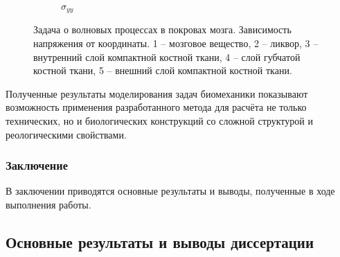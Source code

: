 \begin{figure}[H]
\begin{subfigure}[b]{0.3\textwidth}
\caption{$\sigma_{yy}$}
\end{subfigure}
\caption{Задача о волновых процессах в покровах мозга. Зависимость напряжения от координаты. 1 -- мозговое вещество, 2 -- ликвор, 3 -- внутренний слой компактной костной ткани, 4 -- слой губчатой костной ткани, 5 -- внешний слой компактной костной ткани.}
\label{pic:cranium_2d_1d}
\end{figure}

Полученные результаты моделирования задач биомеханики показывают возможность применения разработанного метода для расчёта не только технических, но и биологических конструкций со сложной структурой и реологическими свойствами.

\subsubsection*{Заключение}

В заключении приводятся основные результаты и выводы, полученные в ходе выполнения работы.


\subsection*{Основные результаты и выводы диссертации}

